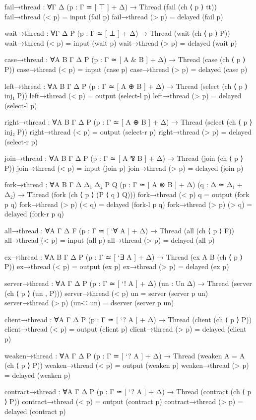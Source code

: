\begin{code}[hide]
fail→thread : ∀{Γ Δ} (p : Γ ≃ [ ⊤ ] + Δ) → Thread (fail (ch ⟨ p ⟩ tt))
fail→thread (< p) = input (fail p)
fail→thread (> p) = delayed (fail p)

wait→thread : ∀{Γ Δ P} (p : Γ ≃ [ ⊥ ] + Δ) → Thread (wait (ch ⟨ p ⟩ P))
wait→thread (< p) = input (wait p)
wait→thread (> p) = delayed (wait p)

case→thread : ∀{A B Γ Δ P} (p : Γ ≃ [ A & B ] + Δ) → Thread (case (ch ⟨ p ⟩ P))
case→thread (< p) = input (case p)
case→thread (> p) = delayed (case p)

left→thread : ∀{A B Γ Δ P} (p : Γ ≃ [ A ⊕ B ] + Δ) → Thread (select (ch ⟨ p ⟩ inj₁ P))
left→thread (< p) = output (select-l p)
left→thread (> p) = delayed (select-l p)

right→thread : ∀{A B Γ Δ P} (p : Γ ≃ [ A ⊕ B ] + Δ) → Thread (select (ch ⟨ p ⟩ inj₂ P))
right→thread (< p) = output (select-r p)
right→thread (> p) = delayed (select-r p)

join→thread : ∀{A B Γ Δ P} (p : Γ ≃ [ A ⅋ B ] + Δ) → Thread (join (ch ⟨ p ⟩ P))
join→thread (< p) = input (join p)
join→thread (> p) = delayed (join p)

fork→thread : ∀{A B Γ Δ Δ₁ Δ₂ P Q} (p : Γ ≃ [ A ⊗ B ] + Δ) (q : Δ ≃ Δ₁ + Δ₂) → Thread (fork (ch ⟨ p ⟩ (P ⟨ q ⟩ Q)))
fork→thread (< p) q = output (fork p q)
fork→thread (> p) (< q) = delayed (fork-l p q)
fork→thread (> p) (> q) = delayed (fork-r p q)

all→thread : ∀{A Γ Δ F} (p : Γ ≃ [ `∀ A ] + Δ) → Thread (all (ch ⟨ p ⟩ F))
all→thread (< p) = input (all p)
all→thread (> p) = delayed (all p)

ex→thread : ∀{A B Γ Δ P} (p : Γ ≃ [ `∃ A ] + Δ) → Thread (ex {A} {B} (ch ⟨ p ⟩ P))
ex→thread (< p) = output (ex p)
ex→thread (> p) = delayed (ex p)

server→thread : ∀{A Γ Δ P} (p : Γ ≃ [ `! A ] + Δ) (un : Un Δ) → Thread (server (ch ⟨ p ⟩ (un , P)))
server→thread (< p) un = server (server p un)
server→thread (> p) (un-∷ un) = dserver (server p un)

client→thread : ∀{A Γ Δ P} (p : Γ ≃ [ `? A ] + Δ) → Thread (client (ch ⟨ p ⟩ P))
client→thread (< p) = output (client p)
client→thread (> p) = delayed (client p)

weaken→thread : ∀{A Γ Δ P} (p : Γ ≃ [ `? A ] + Δ) → Thread (weaken {A = A} (ch ⟨ p ⟩ P))
weaken→thread (< p) = output (weaken p)
weaken→thread (> p) = delayed (weaken p)

contract→thread : ∀{A Γ Δ P} (p : Γ ≃ [ `? A ] + Δ) → Thread (contract (ch ⟨ p ⟩ P))
contract→thread (< p) = output (contract p)
contract→thread (> p) = delayed (contract p)
\end{code}

